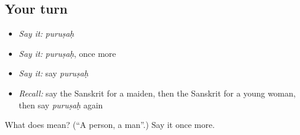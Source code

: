 \subsection*{Your turn}
\begin{itemize}
\raggedright
  \item \emph{Say it:} \emph{puruṣaḥ}
  \item \emph{Say it:} \emph{puruṣaḥ}, once more
  \item \emph{Say it:} say \emph{puruṣaḥ}
  \item \emph{Recall:} say the Sanskrit for a maiden, then the Sanskrit for a young woman, then say \emph{puruṣaḥ} again
\end{itemize}

\begin{tcolorbox}[breakable,colback=teal!4,colframe=teal!35!black,title={Before you move on}]
What does  mean? (\textquotedblleft{}A person, a man\textquotedblright{}.) Say it once more.
\end{tcolorbox}

